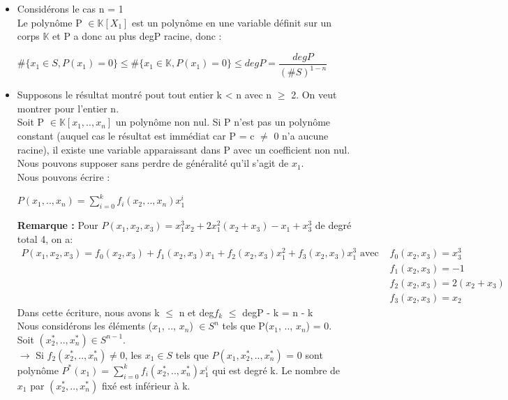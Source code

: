 \documentclass[12pt,a4paper]{article}
\begin{document}
\begin{itemize}
	\item  Considérons le cas n = 1\\
	Le polynôme P $\in \mathbb{K}[X_1]$ est un polynôme en une variable définit sur un corps $\mathbb{K}$ et P a donc au plus degP racine, donc :
	\begin{center}
		$\#\{x_1 \in S, P(x_1) = 0\} \leq \#\{x_1 \in \mathbb{K}, P(x_1) = 0\} \leq degP = \dfrac{degP}{(\#S)^{1 - n}}$
	\end{center}
	\item Supposons le résultat montré pout tout entier k < n avec n $\geq$ 2. On veut montrer pour l'entier n.\\
	Soit P $\in \mathbb{K}[x_1, .., x_n]$ un polynôme non nul. Si P n'est pas un polynôme constant (auquel cas le résultat est immédiat car P = c $\neq$ 0 n'a aucune racine), il existe une variable apparaissant dans P avec un coefficient non nul. Nous pouvons supposer sans perdre de généralité qu'il s'agit de $x_1$.\\
	Nous pouvons écrire :
	\begin{center}
		$P(x_1, .., x_n) = \sum\limits_{i = 0}^{k} f_i(x_2, .., x_n)x_1^i$
	\end{center}
	\textbf{Remarque :} Pour $P(x_1,x_2,x_3) = x_1^3x_2 + 2x_1^2(x_2 + x_3) - x_1 + x_3^3$ de degré total 4, on a:
	\begin{equation}
	\begin{split}\nonumber
	P(x_1, x_2, x_3) = f_0(x_2, x_3) + f_1(x_2, x_3)x_1 + f_2(x_2, x_3)x_1^2 + f_3(x_2, x_3)x_1^3 \text{ avec } & f_0(x_2, x_3) = x_3^3\\
	& f_1(x_2, x_3) = -1\\
	& f_2(x_2, x_3) = 2(x_2 + x_3)\\
	& f_3(x_2, x_3) = x_2
	\end{split}
	\end{equation}
	Dans cette écriture, nous avons k $\leq$ n et deg$f_k$ $\leq$ degP - k = n - k\\
	Nous considérons les éléments ($x_1$, .., $x_n$) $\in S^n$ tels que P($x_1$, .., $x_n$) = 0.\\
	Soit $(x_2^*, .., x_n^*) \in S^{n - 1}$.\\
	$\rightarrow$ Si $f_2(x_2^*, .., x_n^*) \neq 0$, les $x_1 \in S$ tels que $P(x_1, x_2^*, .., x_n^*)$ = 0 sont polynôme $P^*(x_1) = \sum\limits_{i = 0}^{k} f_i(x_2^*, .., x_n^*)x_1^i$ qui est degré k. Le nombre de $x_1$ par $(x_2^*, .., x_n^*)$ fixé est inférieur à k.\\

\end{itemize}
\end{document}
